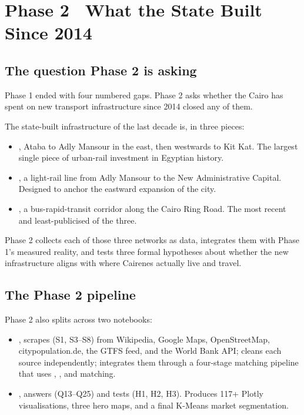
\section{Phase 2 \textbullet\ What the State Built Since 2014}
\label{sec:phase2-intro}

\subsection{The question Phase 2 is asking}

Phase 1 ended with four numbered gaps. Phase 2 asks whether the
 Cairo has spent on new transport infrastructure
since 2014 closed any of them.

The state-built infrastructure of the last decade is, in three pieces:

\begin{itemize}
 \item {}, Ataba to Adly Mansour in the east,
 then westwards to Kit Kat. The largest single piece of urban-rail
 investment in Egyptian history.
 \item {}, a light-rail line from Adly Mansour to the
 New Administrative Capital. Designed to anchor the eastward
 expansion of the city.
 \item {}, a bus-rapid-transit corridor along the
 Cairo Ring Road. The most recent and least-publicised of the
 three.
\end{itemize}

Phase 2 collects each of those three networks as data, integrates
them with Phase 1's measured reality, and tests three formal hypotheses
about whether the new infrastructure aligns with where Cairenes
actually live and travel.

\subsection{The Phase 2 pipeline}

Phase 2 also splits across two notebooks:

\begin{itemize}
 \item {}, 
 scrapes  (S1, S3--S8) from Wikipedia, Google
 Maps, OpenStreetMap, citypopulation.de, the GTFS feed, and the
 World Bank API; cleans each source independently; integrates
 them through a four-stage matching pipeline that uses
 , ,  and  matching.
 \item {}, answers
  (Q13--Q25) and tests
  (H1, H2, H3). Produces 117+
 Plotly visualisations, three hero maps, and a final
 K-Means market segmentation.
\end{itemize}

